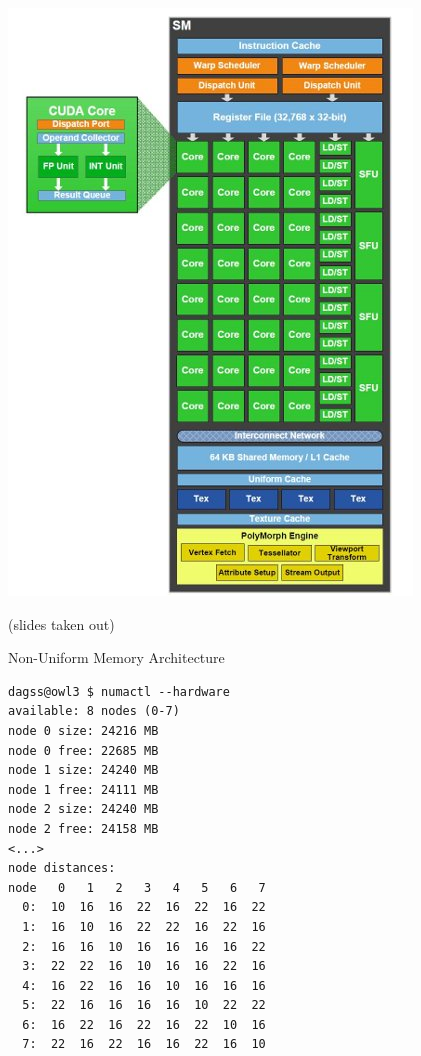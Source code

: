 \documentclass[sans,mathserif]{beamer}
\begin{document}
\begin{frame}
  \includegraphics[height=\textheight]{gpu_sm.jpg}
\end{frame}


\begin{frame}
  (slides taken out)
\end{frame}

\begin{frame}[fragile]{Non-Uniform Memory Architecture}
\footnotesize
\begin{verbatim}
dagss@owl3 $ numactl --hardware
available: 8 nodes (0-7)
node 0 size: 24216 MB
node 0 free: 22685 MB
node 1 size: 24240 MB
node 1 free: 24111 MB
node 2 size: 24240 MB
node 2 free: 24158 MB
<...>
node distances:
node   0   1   2   3   4   5   6   7 
  0:  10  16  16  22  16  22  16  22 
  1:  16  10  16  22  22  16  22  16 
  2:  16  16  10  16  16  16  16  22 
  3:  22  22  16  10  16  16  22  16 
  4:  16  22  16  16  10  16  16  16 
  5:  22  16  16  16  16  10  22  22 
  6:  16  22  16  22  16  22  10  16 
  7:  22  16  22  16  16  22  16  10 
\end{verbatim}
\end{frame}
\end{document}
